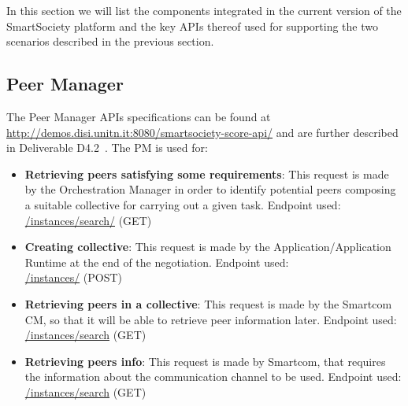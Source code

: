 In this section we will list the components integrated in the current
version of the SmartSociety platform and the key APIs thereof
used for supporting the two scenarios described in the previous
section.

\subsection{Peer Manager}
The Peer Manager APIs specifications can be found at
\url{http://demos.disi.unitn.it:8080/smartsociety-score-api/} and are further
described in Deliverable D4.2~\cite{D4.2}. The PM is used for:
\begin{itemize}
\item {\bf Retrieving peers satisfying some requirements}: This
  request is made by the Orchestration Manager in order to identify
  potential peers composing a suitable collective for carrying out a
  given task. Endpoint used:\\
	\url{/instances/search/} (\textsc{GET})
\item {\bf Creating collective}: This request is made by the Application/Application Runtime at the end of the negotiation. Endpoint used:\\
	\url{/instances/} (\textsc{POST})
\item {\bf Retrieving peers in a collective}: This request is made by
  the Smartcom CM, so that it will be able to retrieve peer information later. Endpoint used:\\
	\url{/instances/search} (\textsc{GET})
\item {\bf Retrieving peers info}: This request is made by Smartcom, that requires the information about the communication channel to be used. Endpoint used:\\
	\url{/instances/search} (\textsc{GET})	
\end{itemize}


